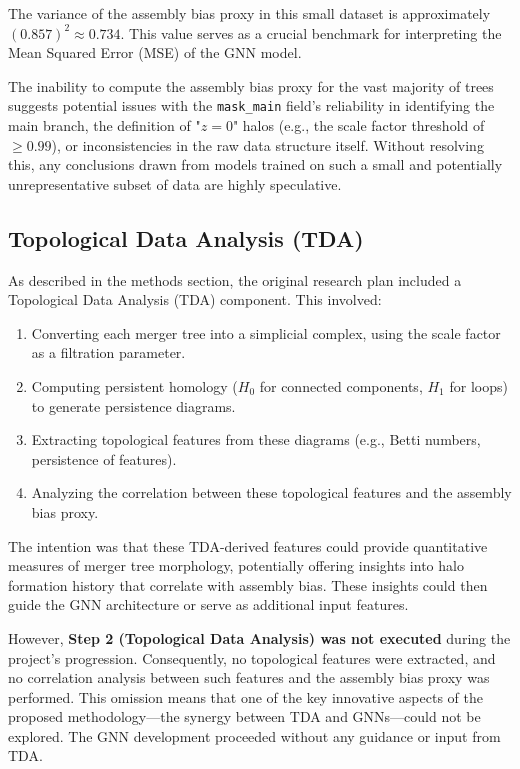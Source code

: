 \documentclass[twocolumn]{aastex631}
\begin{document}
The variance of the assembly bias proxy in this small dataset is approximately $(0.857)^2 \approx 0.734$. This value serves as a crucial benchmark for interpreting the Mean Squared Error (MSE) of the GNN model.

The inability to compute the assembly bias proxy for the vast majority of trees suggests potential issues with the \texttt{mask\_main} field's reliability in identifying the main branch, the definition of "$z=0$" halos (e.g., the scale factor threshold of $\geq 0.99$), or inconsistencies in the raw data structure itself. Without resolving this, any conclusions drawn from models trained on such a small and potentially unrepresentative subset of data are highly speculative.

\subsection{Topological Data Analysis (TDA)}

As described in the methods section, the original research plan included a Topological Data Analysis (TDA) component. This involved:
\begin{enumerate}
    \item Converting each merger tree into a simplicial complex, using the scale factor as a filtration parameter.
    \item Computing persistent homology ($H_0$ for connected components, $H_1$ for loops) to generate persistence diagrams.
    \item Extracting topological features from these diagrams (e.g., Betti numbers, persistence of features).
    \item Analyzing the correlation between these topological features and the assembly bias proxy.
\end{enumerate}

The intention was that these TDA-derived features could provide quantitative measures of merger tree morphology, potentially offering insights into halo formation history that correlate with assembly bias. These insights could then guide the GNN architecture or serve as additional input features.

However, \textbf{Step 2 (Topological Data Analysis) was not executed} during the project's progression. Consequently, no topological features were extracted, and no correlation analysis between such features and the assembly bias proxy was performed. This omission means that one of the key innovative aspects of the proposed methodology—the synergy between TDA and GNNs—could not be explored. The GNN development proceeded without any guidance or input from TDA.
\end{document}
